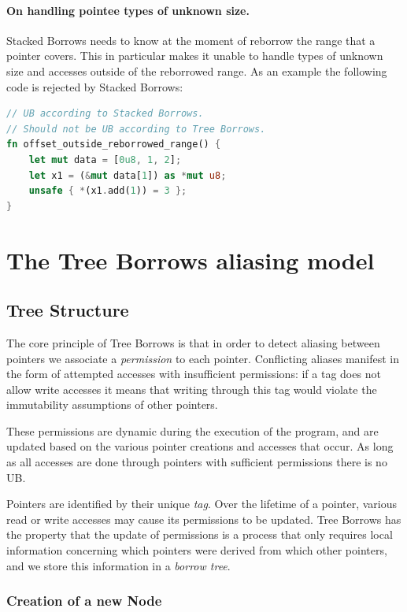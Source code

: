 \documentclass[a4paper,11pt]{article}
\theoremstyle{plain}
\theoremstyle{definition}
\theoremstyle{remark}
\begin{document}
\paragraph*{On handling pointee types of unknown size.}
Stacked Borrows needs to know at the moment of reborrow the range that a pointer
covers. This in particular makes it unable to handle types of unknown size and
accesses outside of the reborrowed range.
As an example the following code is rejected by Stacked Borrows:
\begin{lstlisting}[language=rust]
// UB according to Stacked Borrows.
// Should not be UB according to Tree Borrows.
fn offset_outside_reborrowed_range() {
    let mut data = [0u8, 1, 2];
    let x1 = (&mut data[1]) as *mut u8;
    unsafe { *(x1.add(1)) = 3 };
}
\end{lstlisting}

\section{The Tree Borrows aliasing model}

\subsection{Tree Structure}
\label{sec:tree-structure}

The core principle of Tree Borrows is that in order to detect aliasing between
pointers we associate a \textit{permission} to each pointer. Conflicting aliases
manifest in the form of attempted accesses with insufficient permissions: if
a tag does not allow write accesses it means that writing through this tag
would violate the immutability assumptions of other pointers.

These permissions are dynamic during the execution of the program, and are
updated based on the various pointer creations and accesses that occur. As
long as all accesses are done through pointers with sufficient permissions there
is no UB.

Pointers are identified by their unique \textit{tag}. Over the lifetime of a pointer,
various read or write accesses may cause its permissions to be updated.
Tree Borrows has the property that the update of permissions is a process
that only requires local information concerning which pointers were derived from
which other pointers, and we store this information in a \textit{borrow tree}.

\subsubsection{Creation of a new Node}
\end{document}
